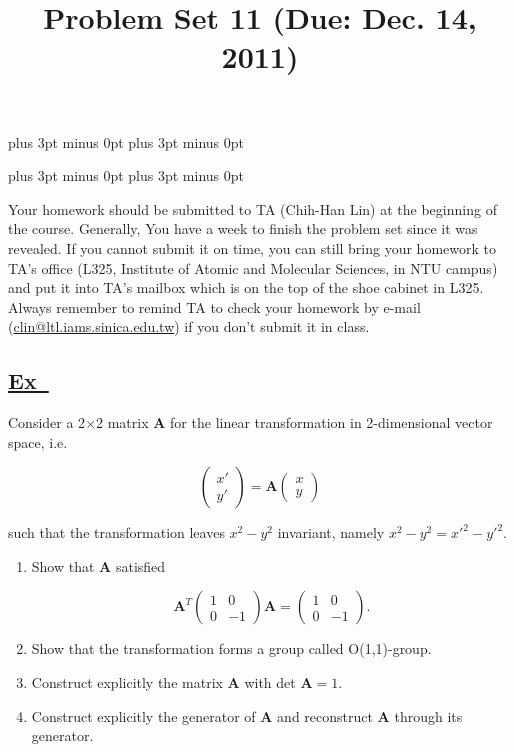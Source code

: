 \documentclass[a4paper,12pt]{article}
\newcommand{\excercise}{\addtocounter{section}{+1}
\subsection*{\underline{Ex~\thesection}}}
\begin{document}
\abovedisplayskip=-6pt plus 3pt minus 0pt
\belowdisplayskip=8pt plus 3pt minus 0pt

\abovedisplayshortskip=-6pt plus 3pt minus 0pt
\belowdisplayshortskip=8pt plus 3pt minus 0pt

\title{Problem Set 11 (Due: Dec. 14, 2011)}
\maketitle

Your homework should be submitted to TA (Chih-Han Lin) at the  beginning of the course. Generally, You have a week to finish the problem set since it was revealed. If you cannot submit it on time, you can still bring your homework to TA's office (L325, Institute of Atomic and Molecular Sciences, in NTU campus) and put it into TA's mailbox which is on the top of the shoe cabinet in L325. Always remember to remind TA to check your homework by e-mail (\url{clin@ltl.iams.sinica.edu.tw}) if you don't submit it in class.

%


\excercise 
Consider a 2$\times$2 matrix $\mathbf{A}$ for the linear transformation in 2-dimensional vector space, i.e.

$$
\begin{pmatrix}x'\\y'\end{pmatrix}=\mathbf{A}\begin{pmatrix}x\\y\end{pmatrix}
$$

\noindent such that the transformation leaves $x^2-y^2$ invariant, namely $x^2-y^2=x'^2-y'^2$.

\begin{enumerate}
\item Show that $\mathbf{A}$ satisfied

$$
\mathbf{A}^T\begin{pmatrix}1&0\\0&-1\end{pmatrix}\mathbf{A}=\begin{pmatrix}1&0\\0&-1\end{pmatrix}.
$$

\item Show that the transformation forms a group called O(1,1)-group.

\item Construct explicitly the matrix $\mathbf{A}$ with det $\mathbf{A}=1$.

\item Construct explicitly the generator of $\mathbf{A}$ and reconstruct $\mathbf{A}$ through its generator.
\end{enumerate}
\end{document}

